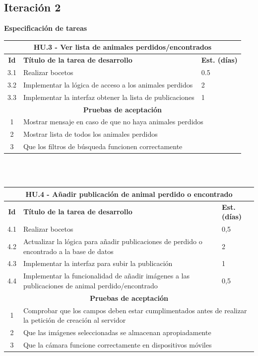 \subsection{Iteración 2}
\large{\textbf{Especificación de tareas}} \\

\begin{tabular}{|c|p{9.5cm}|p{1cm}|}
	\hline
	\multicolumn{3}{|c|}{\textbf{HU.3 - Ver lista de animales perdidos/encontrados}} \\
	\hline
	\textbf{Id} & \textbf{Título de la tarea de desarrollo} & \textbf{Est. (días)} \\
	\hline
	3.1 & Realizar bocetos & 0.5 \\ \hline
	3.2 &  Implementar la lógica de acceso a los animales perdidos & 2 \\ \hline
	3.3 &  Implementar la interfaz obtener la lista de publicaciones & 1 \\ \hline
	\multicolumn{3}{|c|}{\textbf{Pruebas de aceptación}} \\ \hline
	1 & \multicolumn{2}{|l|}{Mostrar mensaje en caso de que no haya animales perdidos} \\ \hline
	2 & \multicolumn{2}{|l|}{Mostrar lista de todos los animales perdidos} \\ \hline
	3 & \multicolumn{2}{|l|}{Que los filtros de búsqueda funcionen correctamente} \\ \hline
\end{tabular} \\ \\


\begin{tabular}{|c|p{9.5cm}|p{1cm}|}
	\hline
	\multicolumn{3}{|c|}{\textbf{HU.4 - Añadir publicación de animal perdido o encontrado}} \\
	\hline
	\textbf{Id} & \textbf{Título de la tarea de desarrollo} & \textbf{Est. (días)} \\
	\hline
	4.1 & Realizar bocetos & 0,5 \\ \hline
	4.2 &  Actualizar la lógica para añadir publicaciones de perdido o encontrado a la base de datos & 2 \\ \hline
	4.3 &  Implementar la interfaz para subir la publicación & 1 \\ \hline
	4.4 &  Implementar la funcionalidad de añadir imágenes a las publicaciones de animal perdido/encontrado & 0,5 \\ \hline
	\multicolumn{3}{|c|}{\textbf{Pruebas de aceptación}} \\ \hline
	1 & \multicolumn{2}{|p{10cm}|}{Comprobar que los campos deben estar cumplimentados antes de realizar la petición de creación al servidor} \\ \hline
	2 & \multicolumn{2}{|p{10cm}|}{Que las imágenes seleccionadas se almacenan apropiadamente} \\ \hline
	3 & \multicolumn{2}{|p{10cm}|}{Que la cámara funcione correctamente en dispositivos móviles} \\ \hline
\end{tabular} \\ \\

